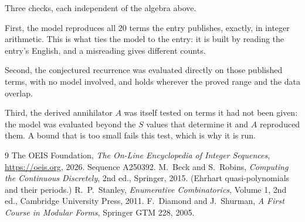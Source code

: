 \documentclass[11pt,a4paper]{article}
\theoremstyle{plain}
\theoremstyle{definition}
\begin{document}
Three checks, each independent of the algebra above.

First, the model reproduces all $20$ terms the entry publishes, exactly, in integer
arithmetic. This is what ties the model to the entry: it is built by reading the entry's
English, and a misreading gives different counts.

Second, the conjectured recurrence was evaluated directly on those published terms, with no
model involved, and holds wherever the proved range and the data overlap.

Third, the derived annihilator $A$ was itself tested on terms it had not been given: the model
was evaluated beyond the $S$ values that determine it and $A$ reproduced them. A bound that is
too small fails this test, which is why it is run.

\begin{thebibliography}{9}
 The OEIS Foundation, \emph{The On-Line Encyclopedia of Integer
Sequences}, \url{https://oeis.org}, 2026. Sequence A250392.
 M.~Beck and S.~Robins, \emph{Computing the Continuous Discretely},
2nd ed., Springer, 2015. (Ehrhart quasi-polynomials and their periods.)
 R.~P.~Stanley, \emph{Enumerative Combinatorics}, Volume 1, 2nd ed.,
Cambridge University Press, 2011.
 F.~Diamond and J.~Shurman, \emph{A First Course in Modular Forms},
Springer GTM 228, 2005.
\end{thebibliography}
\end{document}
